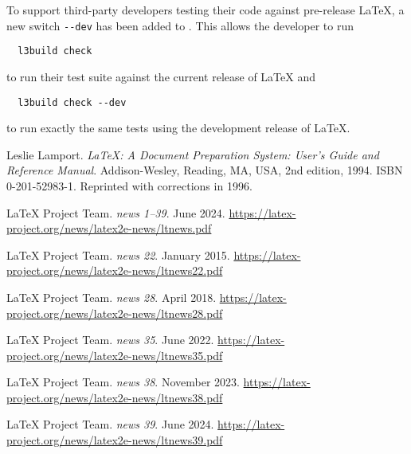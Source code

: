 \documentclass{ltnews}
\begin{document}
To support third-party developers testing their code against pre-release
\LaTeX{}, a new switch \verb|--dev| has been added to .
This allows the developer to run
\begin{verbatim}
  l3build check
\end{verbatim}
to run their test suite against the current release of \LaTeX{} and
\begin{verbatim}
  l3build check --dev
\end{verbatim}
to run exactly the same tests using the development release of
\LaTeX{}.


\begin{thebibliography}{9}\frenchspacing


Leslie Lamport.
\newblock \emph{{\LaTeX}: {A} Document Preparation System: User's Guide and Reference
  Manual}.
\newblock \mbox{Addison}-Wesley, Reading, MA, USA, 2nd edition, 1994.
\newblock ISBN 0-201-52983-1.
\newblock Reprinted with corrections in 1996.

 \LaTeX{} Project Team.
  \emph{\LaTeXe{} news 1--39}. June 2024.
  \url{https://latex-project.org/news/latex2e-news/ltnews.pdf}

 \LaTeX{} Project Team.
  \emph{\LaTeXe{} news 22}. January 2015.
  \url{https://latex-project.org/news/latex2e-news/ltnews22.pdf}

 \LaTeX{} Project Team.
  \emph{\LaTeXe{} news 28}. April 2018.
  \url{https://latex-project.org/news/latex2e-news/ltnews28.pdf}

 \LaTeX{} Project Team.
  \emph{\LaTeXe{} news 35}. June 2022.
  \url{https://latex-project.org/news/latex2e-news/ltnews35.pdf}

 \LaTeX{} Project Team.
  \emph{\LaTeXe{} news 38}. November 2023.
  \url{https://latex-project.org/news/latex2e-news/ltnews38.pdf}

 \LaTeX{} Project Team.
  \emph{\LaTeXe{} news 39}. June 2024.
  \url{https://latex-project.org/news/latex2e-news/ltnews39.pdf}

\end{thebibliography}
\end{document}
